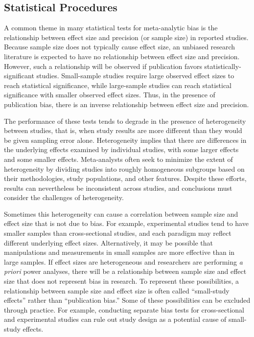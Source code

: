 \documentclass[man, mask]{apa6}
\begin{document}
\subsection{Statistical Procedures}
A common theme in many statistical tests for meta-analytic bias is the relationship between effect size and precision (or sample size) in reported studies. Because sample size does not typically cause effect size, an unbiased research literature is expected to have no relationship between effect size and precision. However, such a relationship will be observed if publication favors statistically-significant studies. Small-sample studies require large observed effect sizes to reach statistical significance, while large-sample studies can reach statistical significance with smaller observed effect sizes. Thus, in the presence of publication bias, there is an inverse relationship between effect size and precision. 

The performance of these tests tends to degrade in the presence of heterogeneity between studies, that is, when study results are more different than they would be given sampling error alone. Heterogeneity implies that there are differences in the underlying effects examined by individual studies, with some larger effects and some smaller effects. Meta-analysts often seek to minimize the extent of heterogeneity by dividing studies into roughly homogeneous subgroups based on their methodologies, study populations, and other features. Despite these efforts, results can nevertheless be inconsistent across studies, and conclusions must consider the challenges of heterogeneity.

Sometimes this heterogeneity can cause a correlation between sample size and effect size that is not due to bias. For example, experimental studies tend to have smaller samples than cross-sectional studies, and each paradigm may reflect different underlying effect sizes. Alternatively, it may be possible that manipulations and measurements in small samples are more effective than in large samples. If effect sizes are heterogeneous and researchers are performing {\em a priori} power analyses, there will be a relationship between sample size and effect size that does not represent bias in research.
To represent these possibilities, a relationship between sample size and effect size is often called ``small-study effects'' rather than ``publication bias.'' Some of these possibilities can be excluded through practice. For example, conducting separate bias tests for cross-sectional and experimental studies can rule out study design as a potential cause of small-study effects.
\end{document}
